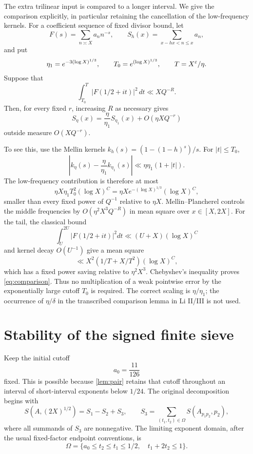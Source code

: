 The extra trilinear input is compared to a longer interval.
We give the comparison explicitly, in particular retaining the
cancellation of the low-frequency kernels.
For a coefficient sequence of fixed divisor bound, let
\[
 F(s)=\sum_{n\asymp X}a_n n^{-s},\qquad
 S_h(x)=\sum_{x-hx<n\le x}a_n,
\]
and put
\[
 \eta_1=e^{-3(\log X)^{1/3}},\qquad
 T_0=e^{(\log X)^{1/3}},\qquad T=X^\varepsilon/\eta.
\]
Suppose that
\[
 \int_{T_0}^{T}|F(1/2+it)|^2\,dt\ll XQ^{-R}.
\]
Then, for every fixed $r$, increasing $R$ as necessary gives
\begin{equation}\label{eq:comparison}
 S_\eta(x)=\frac{\eta}{\eta_1}S_{\eta_1}(x)+O(\eta XQ^{-r})
\end{equation}
outside measure $O(XQ^{-r})$.

To see this, use the Mellin kernels
$k_h(s)=(1-(1-h)^s)/s$.
For $|t|\le T_0$,
\[
 \left|k_\eta(s)-\frac{\eta}{\eta_1}k_{\eta_1}(s)\right|
 \ll\eta\eta_1(1+|t|).
\]
The low-frequency contribution is therefore at most
\[
 \eta X\eta_1T_0^2(\log X)^C
      =\eta X e^{-(\log X)^{1/3}}(\log X)^C,
\]
smaller than every fixed power of $Q^{-1}$ relative to $\eta X$.
Mellin--Plancherel controls the middle frequencies by
$O(\eta^2X^3Q^{-R})$ in mean square over $x\in[X,2X]$.
For the tail, the classical bound
\[
 \int_U^{2U}|F(1/2+it)|^2dt\ll(U+X)(\log X)^C
\]
and kernel decay $O(U^{-1})$ give a mean square
\[
 \ll X^2(1/T+X/T^2)(\log X)^C,
\]
which has a fixed power saving relative to $\eta^2X^3$.
Chebyshev's inequality proves \eqref{eq:comparison}.
Thus no multiplication of a weak pointwise error by the exponentially
large cutoff $T_0$ is required.
The correct scaling is $\eta/\eta_1$; the occurrence of $\eta/\delta$
in the transcribed comparison lemma in Li II/III is not used.

\section{Stability of the signed finite sieve}\label{sec:stability}

Keep the initial cutoff
\[
                         a_0=\frac{11}{126}
\]
fixed. This is possible because \cref{lem:pair} retains that cutoff
throughout an interval of short-interval exponents below $1/24$.
The original decomposition begins with
\[
 S(A,(2X)^{1/2})=S_1-S_2+S_3,\qquad
 S_3=\sum_{(t_1,t_2)\in\Omega}S(A_{p_1p_2},p_2),
\]
where all summands of $S_3$ are nonnegative. The limiting exponent
domain, after the usual fixed-factor endpoint conventions, is
\[
 \Omega=\{a_0\le t_2\le t_1\le1/2,\quad t_1+2t_2\le1\}.
\]

